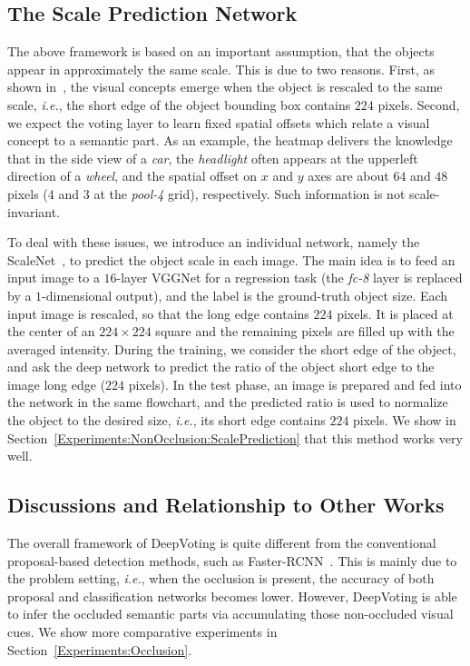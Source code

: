\documentclass[10pt,twocolumn,letterpaper]{article}
\begin{document}
  \subsection{The Scale Prediction Network}
  \label{Framework:ScaleNet}

  The above framework is based on an important assumption, that the objects appear in approximately the same scale. This is due to two reasons. First, as shown in~\cite{Wang_2017_VC_journal}, the visual concepts emerge when the object is rescaled to the same scale, {\em i.e.}, the short edge of the object bounding box contains $224$ pixels. Second, we expect the voting layer to learn fixed spatial offsets which relate a visual concept to a semantic part. As an example, the heatmap delivers the knowledge that in the side view of a {\em car}, the {\em headlight} often appears at the upperleft direction of a {\em wheel}, and the spatial offset on $x$ and $y$ axes are about $64$ and $48$ pixels ($4$ and $3$ at the {\em pool-4} grid), respectively. Such information is not scale-invariant.

  To deal with these issues, we introduce an individual network, namely the ScaleNet~\cite{Qiao_2017_ScaleNet}, to predict the object scale in each image. The main idea is to feed an input image to a $16$-layer VGGNet for a regression task (the {\em fc-8} layer is replaced by a $1$-dimensional output), and the label is the ground-truth object size. Each input image is rescaled, so that the long edge contains $224$ pixels. It is placed at the center of an $224\times224$ square and the remaining pixels are filled up with the averaged intensity. During the training, we consider the short edge of the object, and ask the deep network to predict the ratio of the object short edge to the image long edge ($224$ pixels). In the test phase, an image is prepared and fed into the network in the same flowchart, and the predicted ratio is used to normalize the object to the desired size, {\em i.e.}, its short edge contains $224$ pixels. We show in Section~\ref{Experiments:NonOcclusion:ScalePrediction} that this method works very well.


  \subsection{Discussions and Relationship to Other Works}
  \label{Framework:Discussions}

  The overall framework of DeepVoting is quite different from the conventional proposal-based detection methods, such as Faster-RCNN~\cite{Ren_2015_Faster}. This is mainly due to the problem setting, {\em i.e.}, when the occlusion is present, the accuracy of both proposal and classification networks becomes lower. However, DeepVoting is able to infer the occluded semantic parts via accumulating those non-occluded visual cues. We show more comparative experiments in Section~\ref{Experiments:Occlusion}.
\end{document}
